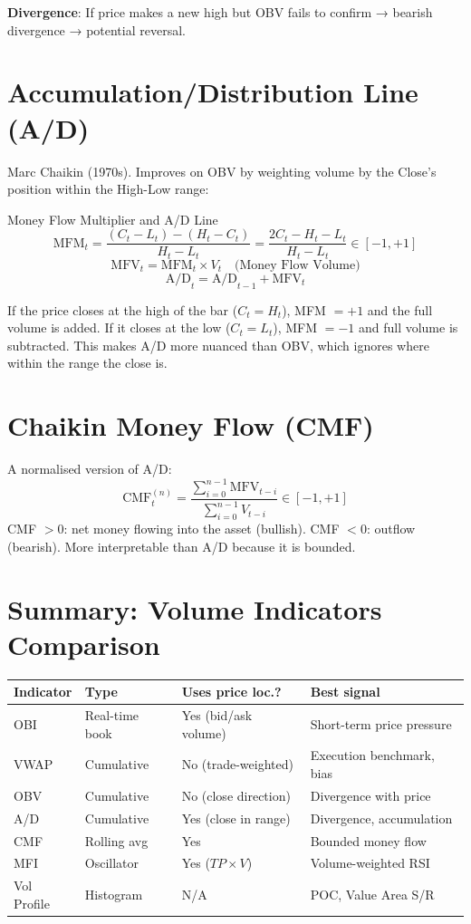 \documentclass[12pt,a4paper,openany]{report}
\theoremstyle{definition}
\begin{document}
\textbf{Divergence}: If price makes a new high but OBV fails to confirm → bearish divergence → potential reversal.

\section{Accumulation/Distribution Line (A/D)}

Marc Chaikin (1970s). Improves on OBV by weighting volume by the Close's position within the High-Low range:

\begin{definitionbox}{Money Flow Multiplier and A/D Line}
\[
  \text{MFM}_t = \frac{(C_t - L_t) - (H_t - C_t)}{H_t - L_t} = \frac{2C_t - H_t - L_t}{H_t - L_t} \in [-1, +1]
\]
\[
  \text{MFV}_t = \text{MFM}_t \times V_t \quad \text{(Money Flow Volume)}
\]
\[
  \text{A/D}_t = \text{A/D}_{t-1} + \text{MFV}_t
\]
\end{definitionbox}

If the price closes at the high of the bar ($C_t = H_t$), MFM $= +1$ and the full volume is added. If it closes at the low ($C_t = L_t$), MFM $= -1$ and full volume is subtracted. This makes A/D more nuanced than OBV, which ignores where within the range the close is.

\section{Chaikin Money Flow (CMF)}

A normalised version of A/D:
\[
  \text{CMF}_t^{(n)} = \frac{\sum_{i=0}^{n-1}\text{MFV}_{t-i}}{\sum_{i=0}^{n-1} V_{t-i}} \in [-1, +1]
\]
CMF $> 0$: net money flowing into the asset (bullish). CMF $< 0$: outflow (bearish). More interpretable than A/D because it is bounded.

\section{Summary: Volume Indicators Comparison}

\begin{center}
\begin{tabular}{llll}
\toprule
\textbf{Indicator} & \textbf{Type} & \textbf{Uses price loc.?} & \textbf{Best signal} \\
\midrule
OBI    & Real-time book & Yes (bid/ask volume) & Short-term price pressure \\
VWAP   & Cumulative     & No (trade-weighted)  & Execution benchmark, bias \\
OBV    & Cumulative     & No (close direction) & Divergence with price \\
A/D    & Cumulative     & Yes (close in range) & Divergence, accumulation \\
CMF    & Rolling avg    & Yes                  & Bounded money flow \\
MFI    & Oscillator     & Yes ($TP \times V$)  & Volume-weighted RSI \\
Vol Profile & Histogram & N/A                  & POC, Value Area S/R \\
\bottomrule
\end{tabular}
\end{center}
\end{document}

